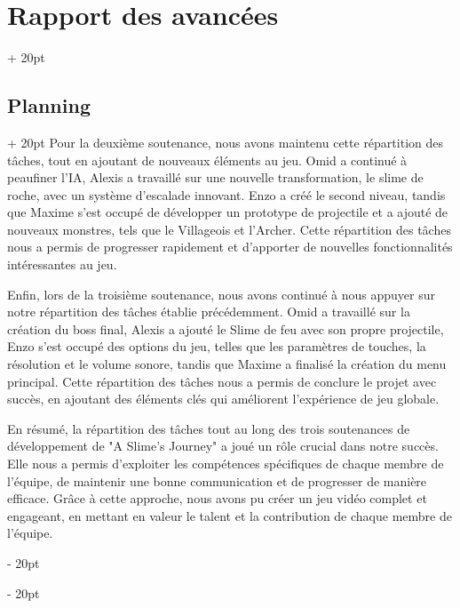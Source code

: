 \documentclass[a4paper, 12pt, twoside]{article}
\newcommand{\ind}[1][20pt]{\advance\leftskip + #1}
\newcommand{\deind}[1][20pt]{\advance\leftskip - #1}
\newenvironment{indt}[2][20pt]{#2 \par \ind[#1]}{\par \deind} %
\begin{document}
\begin{indt}{\section{Rapport des avancées}}
\begin{indt}{\subsection{Planning}}
            Pour la deuxième soutenance, nous avons maintenu cette répartition des tâches, tout en ajoutant de nouveaux éléments au jeu. Omid a continué à peaufiner l'IA, Alexis a travaillé sur une nouvelle transformation, le slime de roche, avec un système d'escalade innovant. Enzo a créé le second niveau, tandis que Maxime s'est occupé de développer un prototype de projectile et a ajouté de nouveaux monstres, tels que le Villageois et l'Archer. Cette répartition des tâches nous a permis de progresser rapidement et d'apporter de nouvelles fonctionnalités intéressantes au jeu.

            Enfin, lors de la troisième soutenance, nous avons continué à nous appuyer sur notre répartition des tâches établie précédemment. Omid a travaillé sur la création du boss final, Alexis a ajouté le Slime de feu avec son propre projectile, Enzo s'est occupé des options du jeu, telles que les paramètres de touches, la résolution et le volume sonore, tandis que Maxime a finalisé la création du menu principal. Cette répartition des tâches nous a permis de conclure le projet avec succès, en ajoutant des éléments clés qui améliorent l'expérience de jeu globale.

            En résumé, la répartition des tâches tout au long des trois soutenances de développement de "A Slime's Journey" a joué un rôle crucial dans notre succès. Elle nous a permis d'exploiter les compétences spécifiques de chaque membre de l'équipe, de maintenir une bonne communication et de progresser de manière efficace. Grâce à cette approche, nous avons pu créer un jeu vidéo complet et engageant, en mettant en valeur le talent et la contribution de chaque membre de l'équipe.


\end{indt}
\end{indt}
\end{document}
